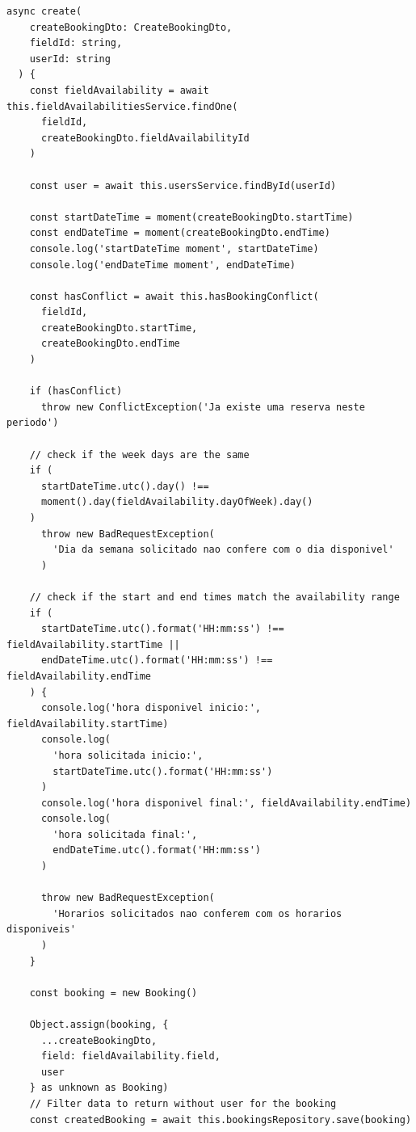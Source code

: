 \begin{lstlisting}[caption={Exemplo de \textit{controller} para \textit{login}.},label={cod:create-booking-service}]
	async create(
    createBookingDto: CreateBookingDto,
    fieldId: string,
    userId: string
  ) {
    const fieldAvailability = await this.fieldAvailabilitiesService.findOne(
      fieldId,
      createBookingDto.fieldAvailabilityId
    )

    const user = await this.usersService.findById(userId)

    const startDateTime = moment(createBookingDto.startTime)
    const endDateTime = moment(createBookingDto.endTime)
    console.log('startDateTime moment', startDateTime)
    console.log('endDateTime moment', endDateTime)

    const hasConflict = await this.hasBookingConflict(
      fieldId,
      createBookingDto.startTime,
      createBookingDto.endTime
    )

    if (hasConflict)
      throw new ConflictException('Ja existe uma reserva neste periodo')

    // check if the week days are the same
    if (
      startDateTime.utc().day() !==
      moment().day(fieldAvailability.dayOfWeek).day()
    )
      throw new BadRequestException(
        'Dia da semana solicitado nao confere com o dia disponivel'
      )

    // check if the start and end times match the availability range
    if (
      startDateTime.utc().format('HH:mm:ss') !== fieldAvailability.startTime ||
      endDateTime.utc().format('HH:mm:ss') !== fieldAvailability.endTime
    ) {
      console.log('hora disponivel inicio:', fieldAvailability.startTime)
      console.log(
        'hora solicitada inicio:',
        startDateTime.utc().format('HH:mm:ss')
      )
      console.log('hora disponivel final:', fieldAvailability.endTime)
      console.log(
        'hora solicitada final:',
        endDateTime.utc().format('HH:mm:ss')
      )

      throw new BadRequestException(
        'Horarios solicitados nao conferem com os horarios disponiveis'
      )
    }

    const booking = new Booking()

    Object.assign(booking, {
      ...createBookingDto,
      field: fieldAvailability.field,
      user
    } as unknown as Booking)
    // Filter data to return without user for the booking
    const createdBooking = await this.bookingsRepository.save(booking)


\end{lstlisting}
